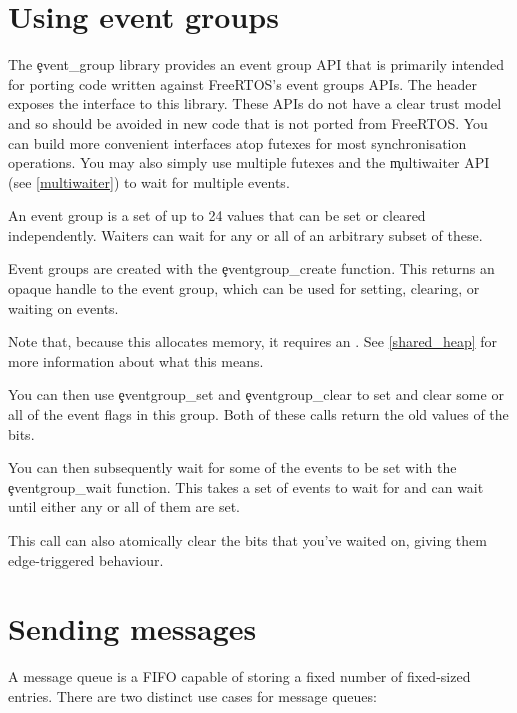 \section{Using event groups}

The \c{event_group} library provides an event group API that is primarily intended for porting code written against FreeRTOS's event groups APIs.
The  header exposes the interface to this library.
These APIs do not have a clear trust model and so should be avoided in new code that is not ported from FreeRTOS.
You can build more convenient interfaces atop futexes for most synchronisation operations.
You may also simply use multiple futexes and the \c{multiwaiter} API (see \ref{multiwaiter}) to wait for multiple events.

An event group is a set of up to 24 values that can be set or cleared independently.
Waiters can wait for any or all of an arbitrary subset of these.

Event groups are created with the \c{eventgroup_create} function.
This returns an opaque handle to the event group, which can be used for setting, clearing, or waiting on events.


Note that, because this allocates memory, it requires an .
See \ref{shared_heap} for more information about what this means.

You can then use \c{eventgroup_set} and \c{eventgroup_clear} to set and clear some or all of the event flags in this group.
Both of these calls return the old values of the bits.



You can then subsequently wait for some of the events to be set with the \c{eventgroup_wait} function.
This takes a set of events to wait for and can wait until either any or all of them are set.


This call can also atomically clear the bits that you've waited on, giving them edge-triggered behaviour.

\section[label=message_queue]{Sending messages}

A message queue is a FIFO capable of storing a fixed number of fixed-sized entries.
There are two distinct use cases for message queues:


